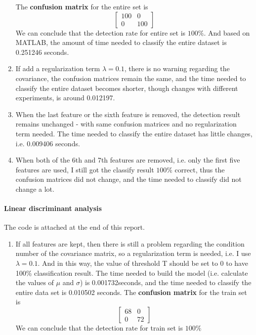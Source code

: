 \documentclass[a4paper]{article}
\begin{document}
\begin{spacing}{2.0}
\begin{enumerate}
The \textbf{confusion matrix} for the entire set is 
$$\begin{bmatrix}
100 & 0 \\
0 & 100 
\end{bmatrix}$$
We can conclude that the detection rate for entire set is $100\%$. And based on MATLAB, the amount of time needed to classify the entire dataset is 0.251246 seconds.\\

\item
If add a regularization term $\lambda = 0.1$, there is no warning regarding the covariance, the confusion matrices remain the same, and the time needed to classify the entire dataset becomes shorter, though changes with different experiments, is around 0.012197.

\item
When the last feature or the sixth feature is removed, the detection result remains unchanged - with same confusion matrices and no regularization term needed. The time needed to classify the entire dataset has little changes, i.e. 0.009406 seconds. 

\item
When both of the 6th and 7th features are removed, i.e. only the first five features are used, I still got the classify result $100\%$ correct, thus the confusion matrices did not change, and the time needed to classify did not change a lot.
\end{enumerate}

\newpage
\paragraph{\huge\textbf{ Linear discriminant analysis\\} }
\normalsize
The code is attached at the end of this report.
\begin{enumerate}
\item If all features are kept, then there is still a problem regarding the condition number of the covariance matrix, so a regularization term is needed, i.e. I use $\lambda = 0.1$. And  in this way, the value of threshold T should be set to 0 to have 100\% classification result. The time needed to build the model (i.e. calculate the values of $\mu$ and $\sigma$) is 0.001732seconds, and the time needed to classify the entire data set is 0.010502 seconds. The \textbf{confusion matrix} for the train set is 
$$\begin{bmatrix}
68 & 0 \\
0 & 72 
\end{bmatrix}$$
We can conclude that the detection rate for train set is $100\%$


\end{enumerate}
\end{spacing}
\end{document}
